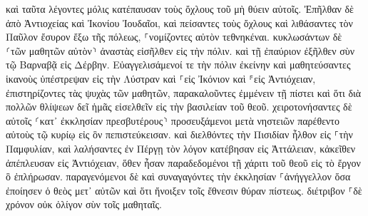 \documentclass[twoside, 9pt]{extreport}
\begin{document}
καὶ ταῦτα λέγοντες μόλις κατέπαυσαν τοὺς ὄχλους τοῦ μὴ θύειν αὐτοῖς. 
Ἐπῆλθαν δὲ ἀπὸ Ἀντιοχείας καὶ Ἰκονίου Ἰουδαῖοι, καὶ πείσαντες τοὺς ὄχλους καὶ λιθάσαντες τὸν Παῦλον ἔσυρον ἔξω τῆς πόλεως, ⸀νομίζοντες αὐτὸν τεθνηκέναι. 
κυκλωσάντων δὲ ⸂τῶν μαθητῶν αὐτὸν⸃ ἀναστὰς εἰσῆλθεν εἰς τὴν πόλιν. καὶ τῇ ἐπαύριον ἐξῆλθεν σὺν τῷ Βαρναβᾷ εἰς Δέρβην. 
Εὐαγγελισάμενοί τε τὴν πόλιν ἐκείνην καὶ μαθητεύσαντες ἱκανοὺς ὑπέστρεψαν εἰς τὴν Λύστραν καὶ ⸀εἰς Ἰκόνιον καὶ ⸁εἰς Ἀντιόχειαν, 
ἐπιστηρίζοντες τὰς ψυχὰς τῶν μαθητῶν, παρακαλοῦντες ἐμμένειν τῇ πίστει καὶ ὅτι διὰ πολλῶν θλίψεων δεῖ ἡμᾶς εἰσελθεῖν εἰς τὴν βασιλείαν τοῦ θεοῦ. 
χειροτονήσαντες δὲ αὐτοῖς ⸂κατ᾽ ἐκκλησίαν πρεσβυτέρους⸃ προσευξάμενοι μετὰ νηστειῶν παρέθεντο αὐτοὺς τῷ κυρίῳ εἰς ὃν πεπιστεύκεισαν. 
καὶ διελθόντες τὴν Πισιδίαν ἦλθον εἰς ⸀τὴν Παμφυλίαν, 
καὶ λαλήσαντες ἐν Πέργῃ τὸν λόγον κατέβησαν εἰς Ἀττάλειαν, 
κἀκεῖθεν ἀπέπλευσαν εἰς Ἀντιόχειαν, ὅθεν ἦσαν παραδεδομένοι τῇ χάριτι τοῦ θεοῦ εἰς τὸ ἔργον ὃ ἐπλήρωσαν. 
παραγενόμενοι δὲ καὶ συναγαγόντες τὴν ἐκκλησίαν ⸀ἀνήγγελλον ὅσα ἐποίησεν ὁ θεὸς μετ᾽ αὐτῶν καὶ ὅτι ἤνοιξεν τοῖς ἔθνεσιν θύραν πίστεως. 
διέτριβον ⸀δὲ χρόνον οὐκ ὀλίγον σὺν τοῖς μαθηταῖς. 
\end{document}
